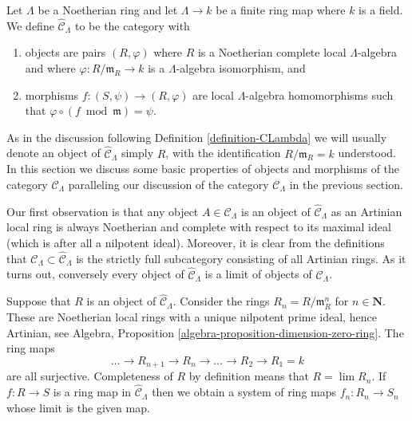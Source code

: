 \begin{definition}
\label{definition-completion-CLambda}
Let $\Lambda$ be a Noetherian ring and let $\Lambda \to k$ be a finite
ring map where $k$ is a field. We define {\it $\widehat{\mathcal{C}}_\Lambda$}
to be the category with
\begin{enumerate}
\item objects are pairs $(R, \varphi)$ where $R$ is a Noetherian complete
local $\Lambda$-algebra and where $\varphi : R/\mathfrak m_R \to k$ is a
$\Lambda$-algebra isomorphism, and
\item morphisms $f : (S, \psi) \to (R, \varphi)$ are local $\Lambda$-algebra
homomorphisms such that $\varphi \circ (f \bmod \mathfrak m) = \psi$.
\end{enumerate}
\end{definition}

\noindent
As in the discussion following
Definition \ref{definition-CLambda}
we will usually denote an object of $\widehat{\mathcal{C}}_\Lambda$
simply $R$, with the identification $R/\mathfrak m_R = k$ understood.
In this section we discuss some basic properties of objects and morphisms
of the category $\widehat{\mathcal{C}}_\Lambda$ paralleling our discussion of
the category $\mathcal{C}_\Lambda$ in the previous section.

\medskip\noindent
Our first observation is that any object $A \in \mathcal{C}_\Lambda$
is an object of $\widehat{\mathcal{C}}_\Lambda$ as an Artinian local
ring is always Noetherian and complete with respect to its maximal ideal
(which is after all a nilpotent ideal). Moreover, it is clear from the
definitions that
$\mathcal{C}_\Lambda \subset \widehat{\mathcal{C}}_\Lambda$
is the strictly full subcategory consisting of all Artinian rings.
As it turns out, conversely every object of
$\widehat{\mathcal{C}}_\Lambda$ is a limit of objects of
$\mathcal{C}_\Lambda$.

\medskip\noindent
Suppose that $R$ is an object of $\widehat{\mathcal{C}}_\Lambda$.
Consider the rings $R_n = R/\mathfrak m_R^n$ for $n \in \mathbf{N}$.
These are Noetherian local rings with a unique nilpotent prime ideal, hence
Artinian, see
Algebra, Proposition \ref{algebra-proposition-dimension-zero-ring}.
The ring maps
$$
\ldots \to R_{n + 1} \to R_n \to \ldots \to R_2 \to R_1 = k
$$
are all surjective. Completeness of $R$ by definition means
that $R = \lim R_n$. If $f : R \to S$ is a ring map in
$\widehat{\mathcal{C}}_\Lambda$ then we obtain a system of ring maps
$f_n : R_n \to S_n$ whose limit is the given map.

